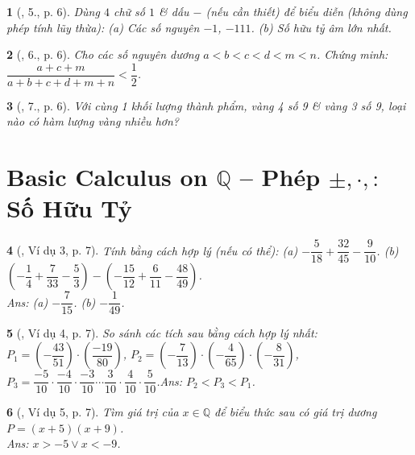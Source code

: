 \documentclass{article}
\newtheorem{baitoan}{}
\begin{document}
\begin{baitoan}[\cite{Tuyen_Toan_7}, 5., p. 6]
	Dùng $4$ chữ số $1$ \& dấu $-$ (nếu cần thiết) để biểu diễn (không dùng phép tính lũy thừa): (a) Các số nguyên $-1$, $-111$. (b) Số hữu tỷ âm lớn nhất.
\end{baitoan}

\begin{baitoan}[\cite{Tuyen_Toan_7}, 6., p. 6]
	Cho các số nguyên dương $a < b < c < d < m < n$. Chứng minh: $\dfrac{a + c + m}{ a + b + c + d + m + n} < \dfrac{1}{2}$.
\end{baitoan}

\begin{baitoan}[\cite{Tuyen_Toan_7}, 7., p. 6]
	Với cùng 1 khối lượng thành phẩm, vàng 4 số 9 \& vàng 3 số 9, loại nào có hàm lượng vàng nhiều hơn?
\end{baitoan}


\section{Basic Calculus on $\mathbb{Q}$ -- Phép $\pm,\cdot,:$ Số Hữu Tỷ}

\begin{baitoan}[\cite{Tuyen_Toan_7}, Ví dụ 3, p. 7]
	Tính bằng cách hợp lý (nếu có thể): (a) $-\dfrac{5}{18} + \dfrac{32}{45} - \dfrac{9}{10}$. (b) $\left(-\dfrac{1}{4} + \dfrac{7}{33} - \dfrac{5}{3}\right) - \left(-\dfrac{15}{12} + \dfrac{6}{11} - \dfrac{48}{49}\right)$.\\\mbox{}\hfill{\sf Ans: (a) $-\dfrac{7}{15}$. (b) $-\dfrac{1}{49}$.}
\end{baitoan}

\begin{baitoan}[\cite{Tuyen_Toan_7}, Ví dụ 4, p. 7]
	So sánh các tích sau bằng cách hợp lý nhất: $P_1 = \left(-\dfrac{43}{51}\right)\cdot\left(\dfrac{-19}{80}\right)$, $P_2 = \left(-\dfrac{7}{13}\right)\cdot\left(-\dfrac{4}{65}\right)\cdot\left(-\dfrac{8}{31}\right)$, $P_3 = \dfrac{-5}{10}\cdot\dfrac{-4}{10}\cdot\dfrac{-3}{10}\cdots\dfrac{3}{10}\cdot\dfrac{4}{10}\cdot\dfrac{5}{10}$.\hfill{\sf Ans: $P_2 < P_3 < P_1$.}
\end{baitoan}

\begin{baitoan}[\cite{Tuyen_Toan_7}, Ví dụ 5, p. 7]
	Tìm giá trị của $x\in\mathbb{Q}$ để biểu thức sau có giá trị dương  $P = (x + 5)(x + 9)$.\\\mbox{}\hfill{\sf Ans: $x > -5\lor x < -9$.}
\end{baitoan}
\end{document}
